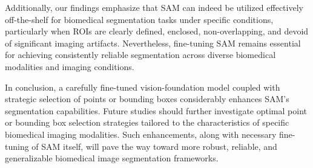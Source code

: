 \documentclass[./dissertation.tex]{subfiles}
\begin{document}
Additionally, our findings emphasize that SAM can indeed be utilized effectively off-the-shelf for biomedical segmentation tasks under specific conditions, particularly when ROIs are clearly defined, enclosed, non-overlapping, and devoid of significant imaging artifacts. Nevertheless, fine-tuning SAM remains essential for achieving consistently reliable segmentation across diverse biomedical modalities and imaging conditions.

In conclusion, a carefully fine-tuned vision-foundation model coupled with strategic selection of points or bounding boxes considerably enhances SAM's segmentation capabilities. Future studies should further investigate optimal point or bounding box selection strategies tailored to the characteristics of specific biomedical imaging modalities. Such enhancements, along with necessary fine-tuning of SAM itself, will pave the way toward more robust, reliable, and generalizable biomedical image segmentation frameworks.
\end{document}
